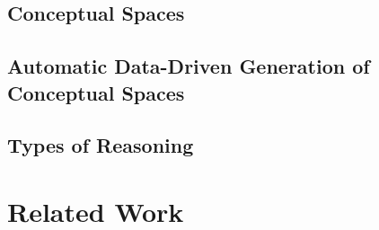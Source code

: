 \documentclass[11pt,
  paper=a4, 
  hidelinks,
  bibliography=totocnumbered,
	captions=tableheading,
	BCOR=10mm
]{scrreprt}
\theoremstyle{definition}
\begin{document}
\section{Conceptual Spaces}


\section{Automatic Data-Driven Generation of Conceptual Spaces}


\section{Types of Reasoning}


\chapter{Related Work}

\end{document}

